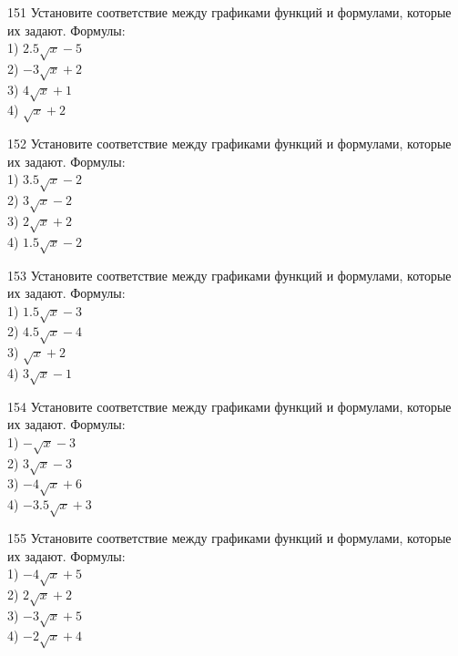 \documentclass[4apaper]{article}
\begin{document}
\begin{taskBN}{151}
Установите соответствие между графиками функций и формулами, которые их задают. Формулы: \\1) $2.5\sqrt{x}-5$\\2) $-3\sqrt{x}+2$\\3) $4\sqrt{x}+1$\\4) $\sqrt{x}+2$
\end{taskBN}

\begin{taskBN}{152}
Установите соответствие между графиками функций и формулами, которые их задают. Формулы: \\1) $3.5\sqrt{x}-2$\\2) $3\sqrt{x}-2$\\3) $2\sqrt{x}+2$\\4) $1.5\sqrt{x}-2$
\end{taskBN}

\begin{taskBN}{153}
Установите соответствие между графиками функций и формулами, которые их задают. Формулы: \\1) $1.5\sqrt{x}-3$\\2) $4.5\sqrt{x}-4$\\3) $\sqrt{x}+2$\\4) $3\sqrt{x}-1$
\end{taskBN}

\begin{taskBN}{154}
Установите соответствие между графиками функций и формулами, которые их задают. Формулы: \\1) $-\sqrt{x}-3$\\2) $3\sqrt{x}-3$\\3) $-4\sqrt{x}+6$\\4) $-3.5\sqrt{x}+3$
\end{taskBN}

\begin{taskBN}{155}
Установите соответствие между графиками функций и формулами, которые их задают. Формулы: \\1) $-4\sqrt{x}+5$\\2) $2\sqrt{x}+2$\\3) $-3\sqrt{x}+5$\\4) $-2\sqrt{x}+4$
\end{taskBN}
\end{document}
